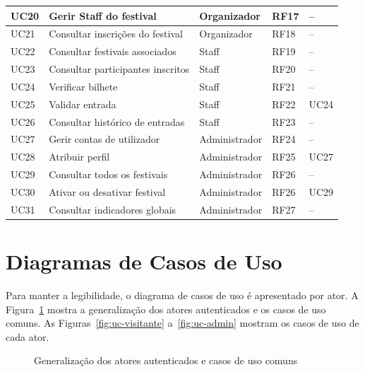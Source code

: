 \begin{longtable}{|l|p{5.6cm}|l|l|p{2.6cm}|}
UC20 & Gerir Staff do festival & Organizador & RF17 & -- \\ \hline
UC21 & Consultar inscrições do festival & Organizador & RF18 & -- \\ \hline
UC22 & Consultar festivais associados & Staff & RF19 & -- \\ \hline
UC23 & Consultar participantes inscritos & Staff & RF20 & -- \\ \hline
UC24 & Verificar bilhete & Staff & RF21 & -- \\ \hline
UC25 & Validar entrada & Staff & RF22 & \incl{} UC24 \\ \hline
UC26 & Consultar histórico de entradas & Staff & RF23 & -- \\ \hline
UC27 & Gerir contas de utilizador & Administrador & RF24 & -- \\ \hline
UC28 & Atribuir perfil & Administrador & RF25 & \extd{} UC27 \\ \hline
UC29 & Consultar todos os festivais & Administrador & RF26 & -- \\ \hline
UC30 & Ativar ou desativar festival & Administrador & RF26 & \extd{} UC29 \\ \hline
UC31 & Consultar indicadores globais & Administrador & RF27 & -- \\ \hline
\end{longtable}

\section{Diagramas de Casos de Uso}

Para manter a legibilidade, o diagrama de casos de uso é apresentado por ator.
A Figura~\ref{fig:uc-geral} mostra a generalização dos atores autenticados e os
casos de uso comuns. As Figuras~\ref{fig:uc-visitante} a~\ref{fig:uc-admin}
mostram os casos de uso de cada ator.

\begin{figure}[H]
\centering
{}
\caption{Generalização dos atores autenticados e casos de uso comuns}
\label{fig:uc-geral}
\end{figure}

